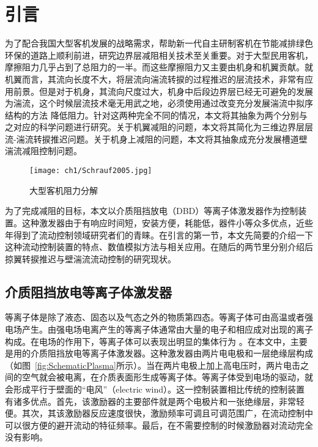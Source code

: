 \chapter{引言}
\label{cha:intro}

为了配合我国大型客机发展的战略需求，帮助新一代自主研制客机在节能减排绿色环保的道路上顺利前进，研究边界层减阻相关技术至关重要。对于大型民用客机，摩擦阻力几乎占到了总阻力的一半\cite{Schrauf2005}。而这些摩擦阻力又主要由机身和机翼贡献。就机翼而言，其流向长度不大，将层流向湍流转捩的过程推迟的层流技术，非常有应用前景\cite{Joslin1998}。但是对于机身，其流向尺度过大，机身中后段边界层已经无可避免的发展为湍流，这个时候层流技术毫无用武之地，必须使用通过改变充分发展湍流中拟序结构的方法 降低阻力。针对这两种完全不同的情况，本文将其抽象为两个分别与之对应的科学问题进行研究。关于机翼减阻的问题，本文将其简化为三维边界层层流-湍流转捩推迟问题。关于机身上减阻的问题，本文将其抽象成充分发展槽道壁湍流减阻控制问题。
\begin{figure}[htb]
  \centering
  \texttt{[image: ch1/Schrauf2005.jpg]}
  \caption{大型客机阻力分解\cite{Schrauf2005}}\label{f:Schrauf2005}
\end{figure}

为了完成减阻的目标，本文以介质阻挡放电（DBD）等离子体激发器作为控制装置。这种激发器由于有响应时间短，安装方便，耗能低，器件小等众多优点，近些年得到了流动控制领域研究者们的青睐。在引言的第一节，本文先简要的介绍一下这种流动控制装置的特点、数值模拟方法与相关应用。在随后的两节里分别介绍后掠翼转捩推迟与壁湍流流动控制的研究现状。


\section{介质阻挡放电等离子体激发器}

等离子体是除了液态、固态以及气态之外的物质第四态\cite{zhangguling2008,niewanshang2012}。等离子体可由高温或者强电场产生。由强电场电离产生的等离子体通常由大量的电子和相应成对出现的离子构成。在电场的作用下，等离子体可以表现出明显的集体行为
\cite{wuhong2015}。在本文中，主要是用的介质阻挡放电等离子体激发器。这种激发器由两片电电极和一层绝缘层构成（如图~\ref{fig:SchematicPlasma}所示）。当在两片电极上加上高电压时，两片电击之间的空气就会被电离，在介质表面形生成等离子体。等离子体受到电场的驱动，就会形成平行于壁面的“电风”（electric wind）。这一控制装置相比传统的控制装置有诸多优点\cite{Corke2010}。首先，该激励器的主要部件就是两个电极片和一张绝缘层，非常轻便。其次，其该激励器反应速度很快，激励频率可调且可调范围广，在流动控制中可以很方便的避开流动的特征频率。最后，在不需要控制的时候激励器对流动完全没有影响。

